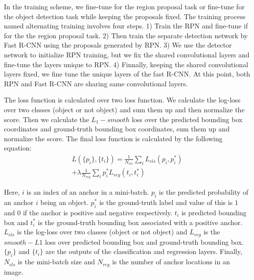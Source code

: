\documentclass[10pt,twocolumn,letterpaper]{article}
\begin{document}
In the training scheme, we fine-tune for the region proposal task or fine-tune for the object detection task while keeping the proposals fixed. The training process named alternating training involves four steps. 1) Train the RPN and fine-tune if for the the region proposal task. 2) Then train the separate detection network by Fast R-CNN using the proposals generated by RPN. 3) We use the detector network to initialize RPN training, but we fix the shared convolutional layers and fine-tune the layers unique to RPN. 4) Finnally, keeping the shared convolutional layers fixed, we fine tune the unique layers of the fast R-CNN. At this point, both RPN and Fast R-CNN are sharing same convolutional layers. \cite{NIPS2015_5638}

The loss function \cite{NIPS2015_5638} is calculated over two loss function. We calculate the log-loss over two clssses (object or not object) and sum them up and then normalize the score. Then we calculate the $L_1-smooth$ loss over the predicted bounding box coordinates and ground-truth bounding box coordinates, sum them up and normalize the score. The final loss function is calculated by the following equation:
\begin{equation}
\begin{split}
L(\{p_i\}, \{t_i\}) = \frac{1}{N_{cls}} \sum_i L_{cls}(p_i, p_{i}^*) \\
                        + \lambda \frac{1}{N_{reg}} \sum_i p_{i}^* L_{reg}(t_i, t_{i}^*)
\end{split}
\end{equation}

Here, $i$ is an index of an anchor in a mini-batch. $p_i$ is the predicted probability of an anchor $i$ being an object. $p_{i}^*$ is the ground-truth label and value of this is $1$ and $0$ if the anchor is positive and negative respectively. $t_i$ is predicted bounding box and $t_{i}^*$ is the ground-truth bounding box associated with a positive anchor. $L_{cls}$ is the log-loss over two classes (object or not object) and $L_{reg}$ is the $smooth-L1$ loss over predicted bounding box and ground-truth bounding box. $\{p_i\}$ and $\{t_i\}$ are the outputs of the classification and regression layers. Finally, $N_{cls}$ is the mini-batch size and $N_{reg}$ is the number of anchor locations in an image.
\end{document}
